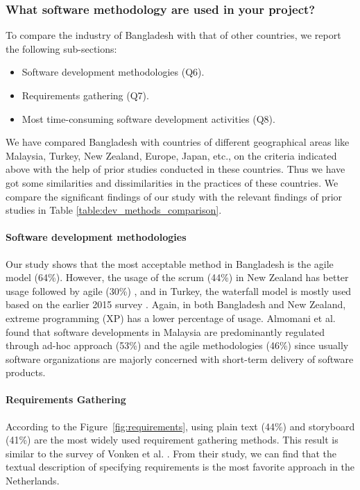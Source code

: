\subsubsection{What software methodology are used in your project?}

To compare the industry of Bangladesh with that of other countries, we report the following sub-sections:

\begin{itemize}
\item Software development methodologies (Q6).
\item Requirements gathering (Q7).
\item Most time-consuming software development activities (Q8).
\end{itemize}



We have compared Bangladesh with countries of different geographical areas like Malaysia, Turkey, New Zealand, Europe, Japan, etc., on the criteria indicated above with the help of prior studies conducted in these countries. Thus we have got some similarities and dissimilarities in the practices of these countries. We compare the significant findings of our study with the relevant findings of prior studies in Table \ref{table:dev_methods_comparison}.


\paragraph{Software development methodologies}
Our study shows that the most acceptable method in Bangladesh is the agile model (64\%). However, the usage of the scrum (44\%) in New Zealand has better usage followed by agile (30\%) \citep{Wang2018}, and in Turkey, the waterfall model is mostly used based on the earlier 2015 survey \citep{Garousi2015}.  Again, in both Bangladesh and New Zealand, extreme programming (XP) has a lower percentage of usage. Almomani et al. \citep{Almomani2015} found that software developments in Malaysia are predominantly regulated through ad-hoc approach (53\%) and the agile methodologies (46\%) since usually software organizations are majorly concerned with short-term delivery of software products.


\paragraph{Requirements Gathering}
According to the Figure~\ref{fig:requirements}, using plain text (44\%) and storyboard (41\%) are the most widely used requirement gathering methods. This result is similar to the survey of Vonken et al. \citep{Vonken2012}. From their study, we can find that the textual description of specifying requirements is the most favorite approach in the Netherlands.


